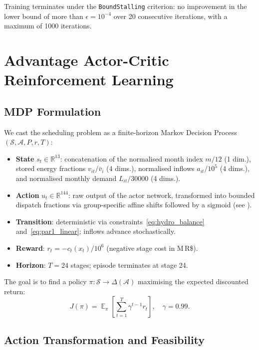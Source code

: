 \documentclass[11pt,letterpaper]{article}
\DeclareMathOperator{\E}{\mathbb{E}}
\newcommand{\R}{\mathbb{R}}
\begin{document}
Training terminates under the \texttt{BoundStalling} criterion:
no improvement in the lower bound of more than $\epsilon = 10^{-4}$ over
20 consecutive iterations, with a maximum of 1000 iterations.

\section{Advantage Actor-Critic Reinforcement Learning}
\label{sec:a2c}

\subsection{MDP Formulation}

We cast the scheduling problem as a finite-horizon Markov Decision Process
$(\mathcal{S}, \mathcal{A}, P, r, T)$:
\begin{itemize}[noitemsep]
  \item \textbf{State} $s_t \in \R^{13}$: concatenation of the normalised
        month index $m/12$ (1 dim.), stored energy fractions $v_{it}/\bar{v}_i$
        (4 dims.), normalised inflows $a_{it}/10^5$ (4 dims.), and normalised
        monthly demand $L_{it}/30000$ (4 dims.).
  \item \textbf{Action} $u_t \in \R^{144}$: raw output of the actor network,
        transformed into bounded dispatch fractions via group-specific
        affine shifts followed by a sigmoid (see ).
  \item \textbf{Transition}: deterministic via constraints~\eqref{eq:hydro_balance}
        and~\eqref{eq:par1_linear}; inflows advance stochastically.
  \item \textbf{Reward}: $r_t = -c_t(x_t)/10^6$ (negative stage cost in M\,R\$).
  \item \textbf{Horizon}: $T = 24$ stages; episode terminates at stage 24.
\end{itemize}

The goal is to find a policy $\pi : \mathcal{S} \to \Delta(\mathcal{A})$
maximising the expected discounted return:
\begin{equation}
  J(\pi) = \E_\pi\!\left[\sum_{t=1}^{T} \gamma^{t-1} r_t\right],
  \quad \gamma = 0.99.
  \label{eq:rl_obj}
\end{equation}

\subsection{Action Transformation and Feasibility}
\label{sec:action}
\end{document}
